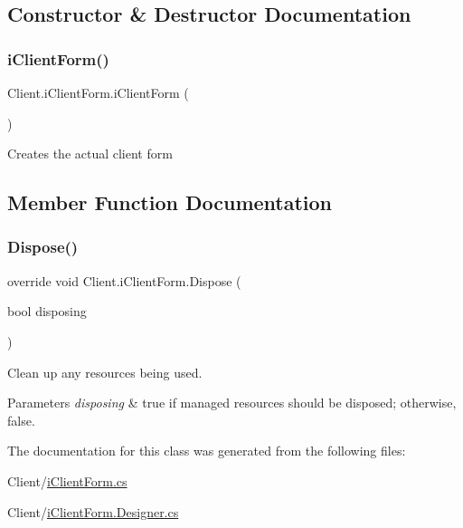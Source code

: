 \subsection{Constructor \& Destructor Documentation}
\mbox{\label{class_client_1_1i_client_form_a02a4efefdc76771e7781b4b30e598465}} 
\subsubsection{\texorpdfstring{i\+Client\+Form()}{iClientForm()}}
{\footnotesize\ttfamily Client.\+i\+Client\+Form.\+i\+Client\+Form (\begin{DoxyParamCaption}{ }\end{DoxyParamCaption})}



Creates the actual client form 



\subsection{Member Function Documentation}
\mbox{\label{class_client_1_1i_client_form_a12dd32ccdf0e36d4e350fc51de41ce7b}} 
\subsubsection{\texorpdfstring{Dispose()}{Dispose()}}
{\footnotesize\ttfamily override void Client.\+i\+Client\+Form.\+Dispose (\begin{DoxyParamCaption}\item[{bool}]{disposing }\end{DoxyParamCaption})\hspace{0.3cm}{\ttfamily [protected]}}



Clean up any resources being used. 


\begin{DoxyParams}{Parameters}
{\em disposing} & true if managed resources should be disposed; otherwise, false.\\
\hline
\end{DoxyParams}


The documentation for this class was generated from the following files\+:\begin{DoxyCompactItemize}
\item 
Client/\mbox{\hyperlink{i_client_form_8cs}{i\+Client\+Form.\+cs}}\item 
Client/\mbox{\hyperlink{i_client_form_8_designer_8cs}{i\+Client\+Form.\+Designer.\+cs}}\end{DoxyCompactItemize}
